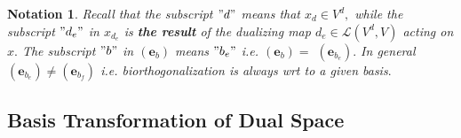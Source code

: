 \documentclass[aps,preprint]{revtex4}
\newtheorem{notation}[theorem]{Notation}
\begin{document}
\begin{notation}
Recall that the subscript $"d"$ means that $x_{d}\in V^{d},$ while the
subscript $"d_{e}"$ in $x_{d_{e}}$ is \textbf{the result} of the dualizing
map $d_{e}\in \mathcal{L}\left( V^{d},V\right) $ acting on $x.$ The
subscript $"b"$ in $\left( \boldsymbol{e}_{b}\right) $ means $"b_{e}"$ i.e. $%
\left( \boldsymbol{e}_{b}\right) =$ $\left( \boldsymbol{e}_{b_{e}}\right) .$
In general $\left( \boldsymbol{e}_{b_{e}}\right) \neq \left( \boldsymbol{e}%
_{b_{f}}\right) $ i.e. biorthogonalization is always wrt to a given basis$.$ 
%
\end{notation}

\subsection{Basis Transformation of Dual Space \label{Basis Transformation
of Dual Space}}
\end{document}
